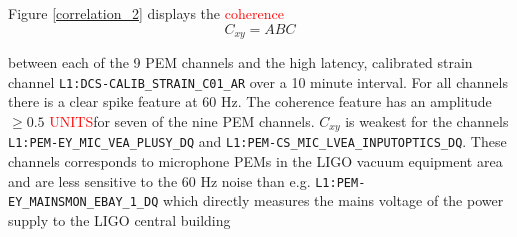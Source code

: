 \documentclass[pra,superscriptaddress,reprint,amsmath,amssymb,nofootinbib]{revtex4-2}
\begin{document}
Figure \ref{correlation_2} displays the \textcolor{red}{coherence}
\begin{equation}
	C_{xy} = ABC \label{eq:coherence}
\end{equation}

 between each of the 9 PEM channels and the high latency, calibrated strain channel \texttt{L1:DCS-CALIB\_STRAIN\_C01\_AR} over a 10 minute interval. For all channels there is a clear spike feature at 60 Hz. The coherence feature has an amplitude $ \ge0.5$ \textcolor{red}{UNITS}for seven of the nine PEM channels. $C_{xy}$ is weakest for the channels \texttt{L1:PEM-EY\_MIC\_VEA\_PLUSY\_DQ} and \texttt{L1:PEM-CS\_MIC\_LVEA\_INPUTOPTICS\_DQ}. These channels corresponds to microphone PEMs in the LIGO vacuum equipment area and are less sensitive to the 60 Hz noise than e.g. \texttt{L1:PEM-EY\_MAINSMON\_EBAY\_1\_DQ} which directly measures the mains voltage of the power supply to the LIGO central building  \newline 
 
\end{document}

